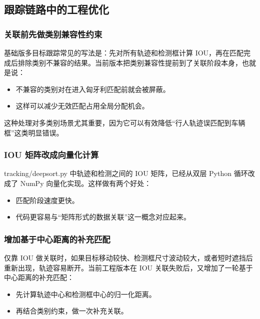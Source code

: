 \subsection{跟踪链路中的工程优化}\label{src-experiment-case2-h80}

\subsubsection{关联前先做类别兼容性约束}\label{src-experiment-case2-h81}

基础版多目标跟踪常见的写法是：先对所有轨迹和检测框计算
IOU，再在匹配完成后排除类别不兼容的结果。当前版本把类别兼容性提前到了关联阶段本身，也就是说：

\begin{itemize}
\tightlist
\item
  不兼容的类别对在进入匈牙利匹配前就会被屏蔽。
\item
  这样可以减少无效匹配占用全局分配机会。
\end{itemize}

这种处理对多类别场景尤其重要，因为它可以有效降低``行人轨迹误匹配到车辆框''这类明显错误。

\subsubsection{IOU 矩阵改成向量化计算}\label{src-experiment-case2-h82}

tracking/deepsort.py 中轨迹和检测之间的 IOU 矩阵，已经从双层 Python
循环改成了 NumPy 向量化实现。这样做有两个好处：

\begin{itemize}
\tightlist
\item
  匹配阶段速度更快。
\item
  代码更容易与``矩阵形式的数据关联''这一概念对应起来。
\end{itemize}

\subsubsection{增加基于中心距离的补充匹配}\label{src-experiment-case2-h83}

仅靠 IOU
做关联时，如果目标移动较快、检测框尺寸波动较大，或者短时遮挡后重新出现，轨迹容易断开。当前工程版本在
IOU 关联失败后，又增加了一轮基于中心距离的补充匹配：

\begin{itemize}
\tightlist
\item
  先计算轨迹中心和检测框中心的归一化距离。
\item
  再结合类别约束，做一次补充关联。
\end{itemize}


